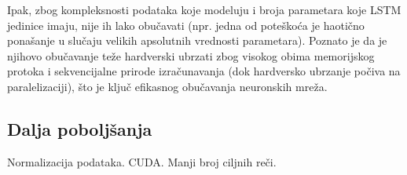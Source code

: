 \documentclass[a4paper]{article}
\begin{document}
Ipak, zbog kompleksnosti podataka koje modeluju i broja parametara koje LSTM jedinice imaju, nije ih lako obučavati (npr. jedna od poteškoća je haotično ponašanje u slučaju velikih apsolutnih vrednosti parametara). Poznato je da je njihovo obučavanje teže hardverski ubrzati zbog visokog obima memorijskog protoka i sekvencijalne prirode izračunavanja (dok hardversko ubrzanje počiva na paralelizaciji), što je ključ efikasnog obučavanja neuronskih mreža.

\subsection{Dalja poboljšanja}

Normalizacija podataka. CUDA. Manji broj ciljnih reči.

\label{sec:zakljucak}




\appendix
 

\end{document}
